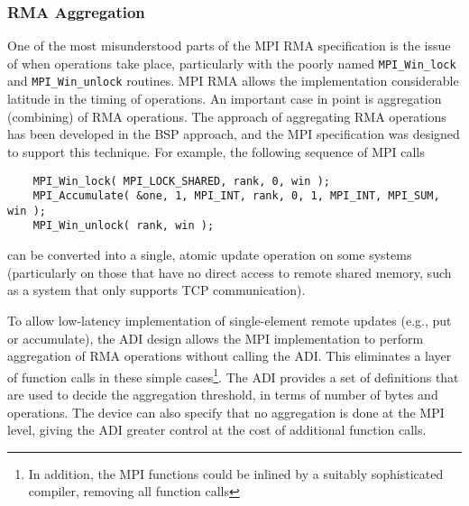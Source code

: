 \documentclass{article}
\def\code#1{\texttt{#1}}
\begin{document}
\subsubsection{RMA Aggregation}
One of the most misunderstood parts of the MPI RMA specification is
the issue of when operations take place, particularly with the poorly
named \code{MPI_Win_lock} and \code{MPI_Win_unlock} routines.  MPI RMA
allows the implementation considerable latitude in the timing of
operations.  An important case in point is aggregation (combining) of RMA
operations.  The approach of aggregating RMA operations has been
developed in the BSP approach, and the MPI specification was designed
to support this technique.  For example, the following sequence of MPI
calls

\begin{small}
\begin{verbatim}
    MPI_Win_lock( MPI_LOCK_SHARED, rank, 0, win );
    MPI_Accumulate( &one, 1, MPI_INT, rank, 0, 1, MPI_INT, MPI_SUM, win );
    MPI_Win_unlock( rank, win );
\end{verbatim}
\end{small}

\noindent
can be converted into a single, atomic update operation on some
systems (particularly on those that have no direct access to remote
shared memory, such as a system that only supports TCP communication).

To allow low-latency implementation of single-element remote updates
(e.g., put or accumulate), the ADI design allows the MPI
implementation to perform aggregation of RMA operations without
calling the ADI.  This eliminates a layer of function calls in these
simple cases\footnote{In addition, the MPI functions could be inlined by a
  suitably sophisticated compiler,
removing all function calls}.  
The ADI provides a set of definitions
that are used to decide the aggregation threshold, in terms of number
of bytes and operations.  The device can also specify that no
aggregation is done at the MPI level, giving the ADI greater control
at the cost of additional function calls.
%
%
\end{document}
